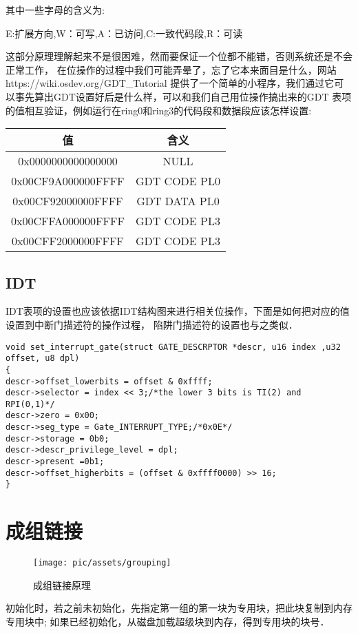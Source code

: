 其中一些字母的含义为: 

E:扩展方向,W：可写,A：已访问,C:一致代码段,R：可读

这部分原理理解起来不是很困难，然而要保证一个位都不能错，否则系统还是不会正常工作，
在位操作的过程中我们可能弄晕了，忘了它本来面目是什么，网站https://wiki.osdev.org/GDT\_Tutorial
提供了一个简单的小程序，我们通过它可以事先算出GDT设置好后是什么样，可以和我们自己用位操作搞出来的GDT
表项的值相互验证，例如运行在ring0和ring3的代码段和数据段应该怎样设置:

\begin{tabular}{|c|c|}%
    \toprule
    值 & 含义\tabularnewline
    \midrule
    0x0000000000000000 & NULL \tabularnewline 
    0x00CF9A000000FFFF & GDT CODE PL0 \tabularnewline 
    0x00CF92000000FFFF & GDT DATA PL0 \tabularnewline 
    0x00CFFA000000FFFF & GDT CODE PL3 \tabularnewline 
    0x00CFF2000000FFFF & GDT CODE PL3 \tabularnewline  
    \bottomrule
\end{tabular}

\subsection{IDT}
IDT表项的设置也应该依据IDT结构图来进行相关位操作，下面是如何把对应的值设置到中断门描述符的操作过程，
陷阱门描述符的设置也与之类似．
\begin{verbatim}
void set_interrupt_gate(struct GATE_DESCRPTOR *descr, u16 index ,u32 offset, u8 dpl)
{
descr->offset_lowerbits = offset & 0xffff;
descr->selector = index << 3;/*the lower 3 bits is TI(2) and RPI(0,1)*/
descr->zero = 0x00;
descr->seg_type = Gate_INTERRUPT_TYPE;/*0x0E*/
descr->storage = 0b0;
descr->descr_privilege_level = dpl;
descr->present =0b1;
descr->offset_higherbits = (offset & 0xffff0000) >> 16;
}
\end{verbatim}


\section{成组链接}

\begin{figure}[!htbp]
		\centering	\texttt{[image: pic/assets/grouping]}
		\caption{成组链接原理}	\label{grouping}	\end{figure}
		
初始化时，若之前未初始化，先指定第一组的第一块为专用块，把此块复制到内存专用块中;
如果已经初始化，从磁盘加载超级块到内存，得到专用块的块号．

